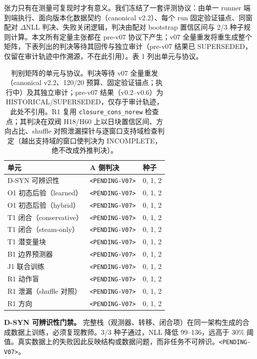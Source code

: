 \documentclass[11pt]{article}
\begin{document}
张力只有在测量可复现时才有意义。我们冻结了一套评测协议：由单一 runner 端到端执行、面向版本化数据契约（canonical v2.2）、每个 run 固定验证锚点、同窗配对 $\Delta$NLL 判决、失败关闭逻辑，判决由配对 bootstrap 置信区间与 2/3 种子规则计算。本文所有定量主张都在 pre-v07 协议下产生；v07 全量重发将重生成整个矩阵，下表列出的判决等待其回传与独立审计（pre-v07 结果已 SUPERSEDED，仅留在审计轨迹中作溯源，不在此引用）。表 1 列出单元与协议。

\begin{table}[t]
\centering
\small
\begin{tabular}{lll}
\toprule
单元 & A 侧判决 & 种子 \\
\midrule
D-SYN 可辨识性 & \texttt{\textless PENDING-V07\textgreater} & 0, 1, 2 \\
O1 初态后验（learned） & \texttt{\textless PENDING-V07\textgreater} & 0, 1, 2 \\
O1 初态后验（hybrid） & \texttt{\textless PENDING-V07\textgreater} & 0, 1, 2 \\
T1 闭合（conservative） & \texttt{\textless PENDING-V07\textgreater} & 0, 1, 2 \\
T1 闭合（steam-only） & \texttt{\textless PENDING-V07\textgreater} & 0, 1, 2 \\
T1 潜变量块 & \texttt{\textless PENDING-V07\textgreater} & 0, 1, 2 \\
B1 边界预测器 & \texttt{\textless PENDING-V07\textgreater} & 0, 1, 2 \\
J1 联合训练 & \texttt{\textless PENDING-V07\textgreater} & 0, 1, 2 \\
R1 动作盲 & \texttt{\textless PENDING-V07\textgreater} & 0, 1, 2 \\
R1 泄漏（shuffle 对照） & \texttt{\textless PENDING-V07\textgreater} & 0, 1, 2 \\
R1 方向 & \texttt{\textless PENDING-V07\textgreater} & 0, 1, 2 \\
\bottomrule
\end{tabular}
\caption{判别矩阵的单元与协议。判决等待 v07 全量重发（canonical v2.2、120/20 预算、固定验证锚点；执行中）及其独立审计；pre-v07 结果（v0.2--v0.6）为 HISTORICAL/SUPERSEDED，仅存于审计轨迹，此处不引用。R1 复用 \texttt{closure\_cons\_norew} 检查点；其判决在双阀 H18/H60 上以日块置信区间、方向占比、shuffle 对照泄漏探针与逐窗口支持域检查判定（越出支持域的窗口使判决为 INCOMPLETE，绝不改成外推判决）。}
\label{tab:verdicts}
\end{table}

\textbf{D-SYN 可辨识性门禁。} 完整栈（观测器、转移、闭合项）在同一架构生成的合成数据上训练，必须复现教师。3/3 种子通过，NLL 降低 99--136，远高于 30\% 阈值。真实数据上的失败因此反映结构或数据问题，而非任务不可辨识。\texttt{\textless PENDING-V07\textgreater}。
\end{document}

